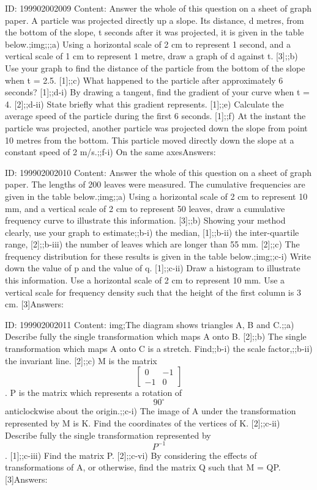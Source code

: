 \documentclass{article}
\begin{document}
ID: 199902002009
Content:
Answer the whole of this question on a sheet of graph paper. A particle was projected directly up a slope. Its distance, d metres, from the bottom of the slope, t seconds after it was projected, it is given in the table below.;img;;;a) Using a horizontal scale of 2 cm to represent 1 second, and a vertical scale of 1 cm to represent 1 metre, draw a graph of d against t. [3];;b) Use your graph to find the distance of the particle from the bottom of the slope when t = 2.5. [1];;c) What happened to the particle after approximately 6 seconds? [1];;d-i) By drawing a tangent, find the gradient of your curve when t = 4. [2];;d-ii) State briefly what this gradient represents. [1];;e) Calculate the average speed of the particle during the first 6 seconds. [1];;f) At the instant the particle was projected, another particle was projected down the slope from point 10 metres from the bottom. This particle moved directly down the slope at a constant speed of 2 m/s.;;f-i) On the same axesAnswers:

ID: 199902002010
Content:
Answer the whole of this question on a sheet of graph paper. The lengths of 200 leaves were measured. The cumulative frequencies are given in the table below.;img;;a) Using a horizontal scale of 2 cm to represent 10 mm, and a vertical scale of 2 cm to represent 50 leaves, draw a cumulative frequency curve to illustrate this information. [3];;b) Showing your method clearly, use your graph to estimate;;b-i) the median, [1];;b-ii) the inter-quartile range, [2];;b-iii) the number of leaves which are longer than 55 mm. [2];;c) The frequency distribution for these results is given in the table below.;img;;c-i) Write down the value of p and the value of q. [1];;c-ii) Draw a histogram to illustrate this information. Use a horizontal scale of 2 cm to represent 10 mm. Use a vertical scale for frequency density such that the height of the first column is 3 cm. [3]Answers:

ID: 199902002011
Content:
img;The diagram shows triangles A, B and C.;;a) Describe fully the single transformation which maps A onto B. [2];;b) The single transformation which maps A onto C is a stretch. Find;;b-i) the scale factor,;;b-ii) the invariant line. [2];;c) M is the matrix $$\begin{bmatrix}0&-1\\-1&0\end{bmatrix}$$. P is the matrix which represents a rotation of $$90^{\circ}$$ anticlockwise about the origin.;;c-i) The image of A under the transformation represented by M is K. Find the coordinates of the vertices of K. [2];;c-ii) Describe fully the single transformation represented by $$P^{-1}$$. [1];;c-iii) Find the matrix P. [2];;c-vi) By considering the effects of transformations of A, or otherwise, find the matrix Q such that M = QP. [3]Answers:
\end{document}
